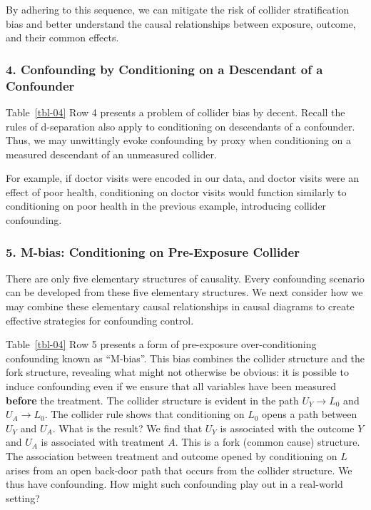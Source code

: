\documentclass[
  singlecolumn]{article}
\begin{document}
By adhering to this sequence, we can mitigate the risk of collider
stratification bias and better understand the causal relationships
between exposure, outcome, and their common effects.

\subsubsection{4. Confounding by Conditioning on a Descendant of a
Confounder}\label{confounding-by-conditioning-on-a-descendant-of-a-confounder}

Table~\ref{tbl-04} Row 4 presents a problem of collider bias by decent.
Recall the rules of d-separation also apply to conditioning on
descendants of a confounder. Thus, we may unwittingly evoke confounding
by proxy when conditioning on a measured descendant of an unmeasured
collider.

For example, if doctor visits were encoded in our data, and doctor
visits were an effect of poor health, conditioning on doctor visits
would function similarly to conditioning on poor health in the previous
example, introducing collider confounding.

\subsubsection{5. M-bias: Conditioning on Pre-Exposure
Collider}\label{m-bias-conditioning-on-pre-exposure-collider}

There are only five elementary structures of causality. Every
confounding scenario can be developed from these five elementary
structures. We next consider how we may combine these elementary causal
relationships in causal diagrams to create effective strategies for
confounding control.

Table~\ref{tbl-04} Row 5 presents a form of pre-exposure
over-conditioning confounding known as ``M-bias''. This bias combines
the collider structure and the fork structure, revealing what might not
otherwise be obvious: it is possible to induce confounding even if we
ensure that all variables have been measured \textbf{before} the
treatment. The collider structure is evident in the path \(U_Y \to L_0\)
and \(U_A \to L_0\). The collider rule shows that conditioning on
\(L_0\) opens a path between \(U_Y\) and \(U_A\). What is the result? We
find that \(U_Y\) is associated with the outcome \(Y\) and \(U_A\) is
associated with treatment \(A\). This is a fork (common cause)
structure. The association between treatment and outcome opened by
conditioning on \(L\) arises from an open back-door path that occurs
from the collider structure. We thus have confounding. How might such
confounding play out in a real-world setting?
\end{document}
